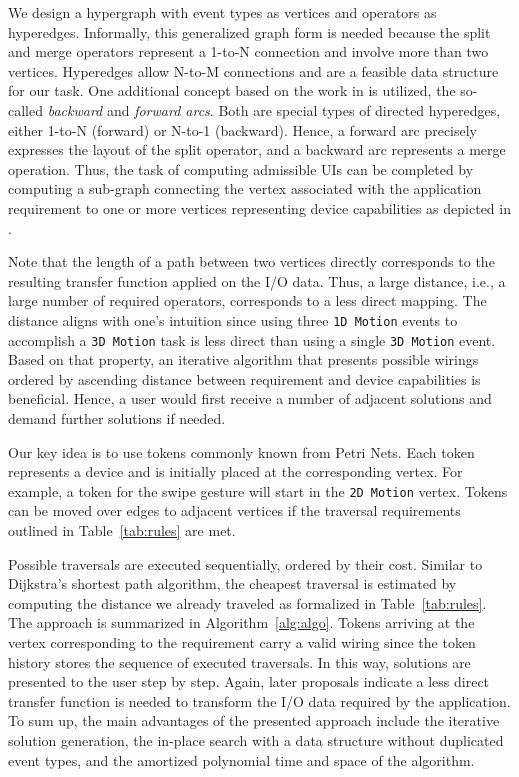 \documentclass[twoside,twocolumn,10pt]{article}
\begin{document}
%
%
We design a hypergraph with event types as vertices and operators as hyperedges. Informally, this generalized graph form is needed because the split and merge operators represent a 1-to-N connection and involve more than two vertices. Hyperedges allow N-to-M connections and are a feasible data structure for our task. One additional concept based on the work in \cite{Gallo:1993:DHA:153578.153586} is utilized, the so-called \textit{backward} and \textit{forward arcs}. Both are special types of directed hyperedges, either 1-to-N (forward) or N-to-1 (backward). Hence, a forward arc precisely expresses the layout of the split operator, and a backward arc represents a merge operation. Thus, the task of computing admissible UIs can be completed by computing a sub-graph connecting the vertex associated with the application requirement to one or more vertices representing device capabilities as depicted in .



%
%

Note that the length of a path between two vertices directly corresponds to the resulting transfer function applied on the I/O data. Thus, a large distance, i.e., a large number of required operators, corresponds to a less direct mapping. The distance aligns with one's intuition since using three \texttt{1D Motion} events to accomplish a \texttt{3D Motion} task is less direct than using a single \texttt{3D Motion} event. Based on that property, an iterative algorithm that presents possible wirings ordered by ascending distance between requirement and device capabilities is beneficial. Hence, a user would first receive a number of adjacent solutions and demand further solutions if needed.




%
%
Our key idea is to use tokens commonly known from Petri Nets. Each token represents a device and is initially placed at the corresponding vertex. For example, a token for the swipe gesture will start in the \texttt{2D Motion} vertex. Tokens can be moved over edges to adjacent vertices if the traversal requirements outlined in Table~\ref{tab:rules} are met.



%
%
Possible traversals are executed sequentially, ordered by their cost. Similar to Dijkstra's shortest path algorithm, the cheapest traversal is estimated by computing the distance we already traveled as formalized in Table~\ref{tab:rules}. The approach is summarized in Algorithm~\ref{alg:algo}. Tokens arriving at the vertex corresponding to the requirement carry a valid wiring since the token history stores the sequence of executed traversals. In this way, solutions are presented to the user step by step. Again, later proposals indicate a less direct transfer function is needed to transform the I/O data required by the application. To sum up, the main advantages of the presented approach include the iterative solution generation, the in-place search with a data structure without duplicated event types, and the amortized polynomial time and space of the algorithm.
\end{document}
